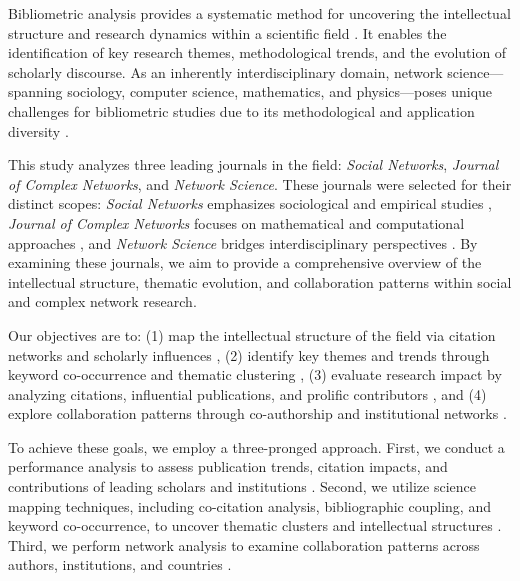 \documentclass[twocolumn]{article}
\begin{document}
	Bibliometric analysis provides a systematic method for uncovering the intellectual structure and research dynamics within a scientific field \cite{donthu2021bibliometric,arias2020bibliometric, WOS:001124720500001, WOS:000208374100011}. It enables the identification of key research themes, methodological trends, and the evolution of scholarly discourse. As an inherently interdisciplinary domain, network science—spanning sociology, computer science, mathematics, and physics—poses unique challenges for bibliometric studies due to its methodological and application diversity \cite{Newman2018,Barabasi2016}.
	
	This study analyzes three leading journals in the field: \textit{Social Networks}, \textit{Journal of Complex Networks}, and \textit{Network Science}. These journals were selected for their distinct scopes: \textit{Social Networks} emphasizes sociological and empirical studies \cite{wasserman1994social}, \textit{Journal of Complex Networks} focuses on mathematical and computational approaches \cite{boccaletti2006complex}, and \textit{Network Science} bridges interdisciplinary perspectives \cite{Newman2010}. By examining these journals, we aim to provide a comprehensive overview of the intellectual structure, thematic evolution, and collaboration patterns within social and complex network research.
	
	Our objectives are to: (1) map the intellectual structure of the field via citation networks and scholarly influences \cite{Small1973}, (2) identify key themes and trends through keyword co-occurrence and thematic clustering \cite{callon1983co}, (3) evaluate research impact by analyzing citations, influential publications, and prolific contributors \cite{garfield1979citation}, and (4) explore collaboration patterns through co-authorship and institutional networks \cite{glanzel2004coauthorship}.
	
	To achieve these goals, we employ a three-pronged approach. First, we conduct a performance analysis to assess publication trends, citation impacts, and contributions of leading scholars and institutions \cite{bornmann2011citation}. Second, we utilize science mapping techniques, including co-citation analysis, bibliographic coupling, and keyword co-occurrence, to uncover thematic clusters and intellectual structures \cite{van2010visualizing,chen2017citespace}. Third, we perform network analysis to examine collaboration patterns across authors, institutions, and countries \cite{newman2004coauthorship, moody2004sociology}.
	
\end{document}
